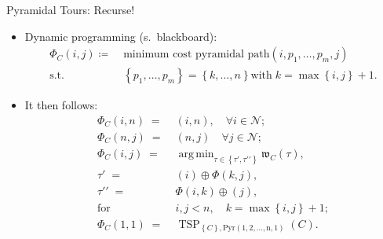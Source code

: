 \documentclass[
  size=10pt,
  style=klope,
  paper=screen,
  pauseslide,
  nopagebreaks,
  fleqn
]{powerdot}
\DeclareMathOperator*{\argmin}{arg\,min}
\begin{document}
\begin{slide}{Pyramidal Tours: Recurse!}
\begin{itemize}
  \item
  Dynamic programming (s.\ blackboard):
  \begin{align}
    \Phi_C\left(i,j\right) \coloneqq \; & \text{minimum cost pyramidal path} \left(i,p_1,\ldots,p_m,j\right) \\
    \text{s.t.} \; & \left\{ p_1,\ldots,p_m \right\} = \left\{ k,\ldots,n \right\}
    \text{with} \; k = \max\left\{i,j\right\}+1.
  \end{align}
  \item
  It then follows:
    \begin{align}
    \Phi_C\left(i,n\right) \; = \; & \left(i,n\right), \quad \forall i \in \mathcal{N};
    \\
    \Phi_C\left(n,j\right) \; = \; & \left(n,j\right) \quad \forall j \in \mathcal{N};
    \\
    \Phi_C\left(i,j\right) \; = \; & \argmin_{\tau \in \left\{\tau\prime, \tau\prime\prime\right\}}
    \mathfrak{w}_C\left(\tau\right),
    \\
    \tau\prime \; = \; & \left(i\right) \oplus \Phi\left(k,j\right),
    \\
    \tau\prime\prime \; = \; & \Phi\left(i,k\right) \oplus \left(j\right),
    \\
    \text{for} \; & i,j < n, \quad k = \max\left\{i,j\right\}+1;
    \\
    \Phi_C\left(1,1\right) \; = \; &
    \operatorname{TSP}_{\left\{C\right\},\operatorname{Pyr\left(1,2,\ldots,n,1\right)}}\left(C\right).
    \end{align}
\end{itemize}
\end{slide}
\end{document}
